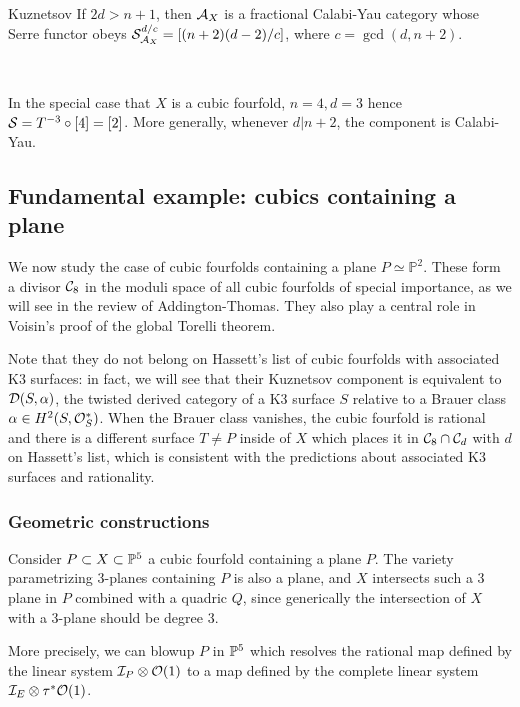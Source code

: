 \begin{corollary}{Kuznetsov}{}
    If $2d>n+1$, then $\calA_X$ is a fractional Calabi-Yau category whose Serre functor obeys $\calS_{\calA_X}^{d/c}=[(n+2)(d-2)/c]$, where $c=\gcd(d,n+2)$.

    ~

    In the special case that $X$ is a cubic fourfold, $n=4,d=3$ hence $\calS=T^{-3}\circ [4]=[2]$. More generally, whenever $d|n+2$, the component is Calabi-Yau.
\end{corollary}

\subsection{Fundamental example: cubics containing a plane}
We now study the case of cubic fourfolds containing a plane $P\simeq \mathbb{P}^2$. These form a divisor $\calC_8$ in the moduli space of all cubic fourfolds of special importance, as we will see in the review of Addington-Thomas. They also play a central role in Voisin's proof of the global Torelli theorem.

Note that they do not belong on Hassett's list of cubic fourfolds with associated K3 surfaces: in fact, we will see that their Kuznetsov component is equivalent to $\calD(S,\alpha)$, the twisted derived category of a K3 surface $S$ relative to a Brauer class $\alpha\in H^2(S, \O_S^*)$. When the Brauer class vanishes, the cubic fourfold is rational and there is a different surface $T\neq P$ inside of $X$ which places it in $\calC_8\cap \calC_d$ with $d$ on Hassett's list, which is consistent with the predictions about associated K3 surfaces and rationality.

\subsubsection{Geometric constructions}

Consider $P\subset X \subset \P^5$ a cubic fourfold containing a plane $P$. The variety parametrizing $3$-planes containing $P$ is also a plane, and $X$ intersects such a $3$ plane in $P$ combined with a quadric $Q$, since generically the intersection of $X$ with a 3-plane should be degree $3$.

More precisely, we can blowup $P$ in $\P^5$ which resolves the rational map defined by the linear system $\calI_P \otimes \O(1)$ to a map defined by the complete linear system $\calI_E \otimes \tau^*\O(1)$.

\begin{center}
\end{center}

